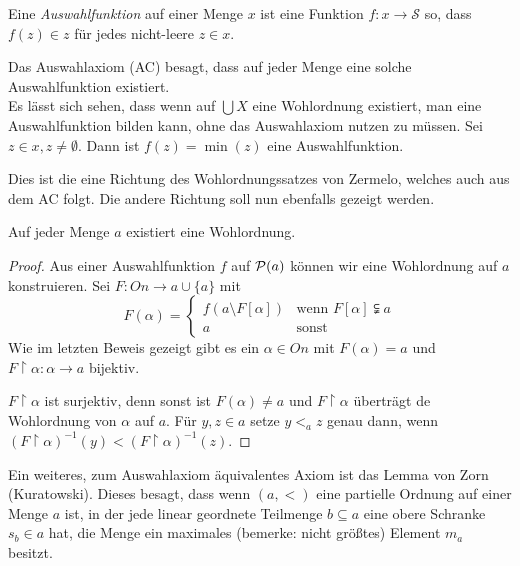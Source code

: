 \begin{definition}[Auswahlfunktionen]
	Eine \textit{Auswahlfunktion} auf einer Menge $x$ ist eine Funktion $f:x\to\mathcal{S}$ so, dass $f(z)\in z$ für jedes nicht-leere $z\in x$.
\end{definition}

Das Auswahlaxiom (AC) besagt, dass auf jeder Menge eine solche Auswahlfunktion existiert.\\

Es lässt sich sehen, dass wenn auf $\bigcup X$ eine Wohlordnung existiert, man eine Auswahlfunktion bilden kann, ohne das Auswahlaxiom nutzen zu müssen. Sei $z\in x, z\neq\emptyset$. Dann ist $f(z)=\min(z)$ eine Auswahlfunktion. 

Dies ist die eine Richtung des Wohlordnungssatzes von Zermelo, welches auch aus dem AC folgt. Die andere Richtung soll nun ebenfalls gezeigt werden.

\begin{satz}
	Auf jeder Menge $a$ existiert eine Wohlordnung.
\end{satz}
\begin{proof}
	Aus einer Auswahlfunktion $f$ auf $\mathcal{P}(a)$ können wir eine Wohlordnung auf $a$ konstruieren. Sei $F:On\to a\cup \{a\}$ mit
	$$
	F(\alpha)=\begin{cases}
		f(a\setminus F[\alpha]) & \text{wenn } F[\alpha]\subsetneqq a \\
		a & \text{sonst}
	\end{cases}
	$$
	Wie im letzten Beweis gezeigt gibt es ein $\alpha\in On$ mit $F(\alpha)=a$ und $F\upharpoonright \alpha:\alpha\to a$ bijektiv.
	
	$F\upharpoonright\alpha$ ist surjektiv, denn sonst ist $F(\alpha)\neq a$ und $F\upharpoonright\alpha$ überträgt de Wohlordnung von $\alpha$ auf $a$. Für $y,z\in a$ setze $y <_a z$ genau dann, wenn $(F\upharpoonright\alpha)^{-1}(y) < (F\upharpoonright\alpha)^{-1}(z)$.
\end{proof}

Ein weiteres, zum Auswahlaxiom äquivalentes Axiom ist das Lemma von Zorn (Kuratowski).
Dieses besagt, dass wenn $(a,<)$ eine partielle Ordnung auf einer Menge $a$ ist, in der jede linear geordnete Teilmenge $b\subseteq a$ eine obere Schranke $s_b\in a$ hat, die Menge ein maximales (bemerke: nicht größtes) Element $m_a$ besitzt.


